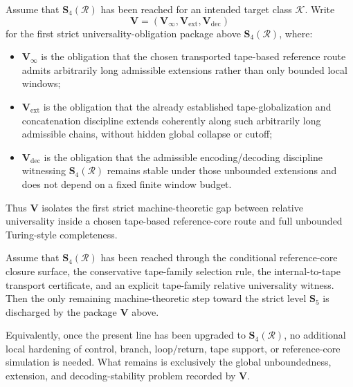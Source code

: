 \begin{definition}
Assume that \(\mathbf S_4(\mathcal R)\) has been reached for an intended target class \(\mathcal K\). Write
\[
\mathbf V=(\mathbf V_\infty,\mathbf V_{\mathrm{ext}},\mathbf V_{\mathrm{dec}})
\]
for the first strict universality-obligation package above \(\mathbf S_4(\mathcal R)\), where:
\begin{itemize}[leftmargin=2em]
 \item \(\mathbf V_\infty\) is the obligation that the chosen transported tape-based reference route admits arbitrarily long admissible extensions rather than only bounded local windows;
 \item \(\mathbf V_{\mathrm{ext}}\) is the obligation that the already established tape-globalization and concatenation discipline extends coherently along such arbitrarily long admissible chains, without hidden global collapse or cutoff;
 \item \(\mathbf V_{\mathrm{dec}}\) is the obligation that the admissible encoding/decoding discipline witnessing \(\mathbf S_4(\mathcal R)\) remains stable under those unbounded extensions and does not depend on a fixed finite window budget.
\end{itemize}
Thus \(\mathbf V\) isolates the first strict machine-theoretic gap between relative universality inside a chosen tape-based reference-core route and full unbounded Turing-style completeness.
\end{definition}

\begin{proposition}
Assume that \(\mathbf S_4(\mathcal R)\) has been reached through the conditional reference-core closure surface, the conservative tape-family selection rule, the internal-to-tape transport certificate, and an explicit tape-family relative universality witness. Then the only remaining machine-theoretic step toward the strict level \(\mathbf S_5\) is discharged by the package \(\mathbf V\) above.

Equivalently, once the present line has been upgraded to \(\mathbf S_4(\mathcal R)\), no additional local hardening of control, branch, loop/return, tape support, or reference-core simulation is needed. What remains is exclusively the global unboundedness, extension, and decoding-stability problem recorded by \(\mathbf V\).
\end{proposition}

